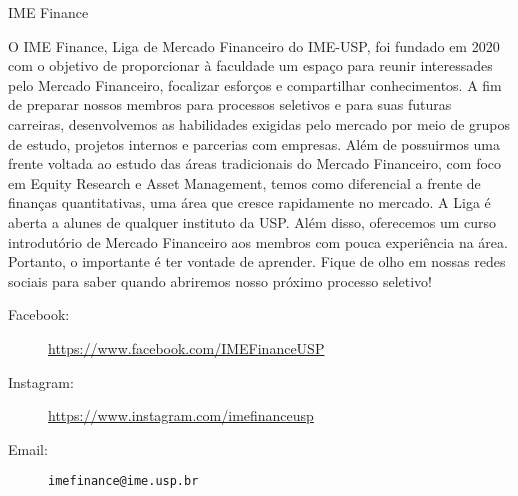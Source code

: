 \begin{subsecao}{IME Finance}

	

O IME Finance, Liga de Mercado Financeiro do IME-USP, foi fundado em 2020 com o 
objetivo de proporcionar à faculdade um espaço para reunir interessades pelo 
Mercado Financeiro, focalizar esforços e compartilhar conhecimentos.
A fim de preparar nossos membros para processos seletivos e para suas futuras 
carreiras, desenvolvemos as habilidades exigidas pelo mercado por meio de grupos de 
estudo, projetos internos e parcerias com empresas. Além de possuirmos uma frente 
voltada ao estudo das áreas tradicionais do Mercado Financeiro, com foco em Equity
Research e Asset Management, temos como diferencial a frente de finanças quantitativas, 
uma área que cresce rapidamente no mercado. A Liga é aberta a alunes de qualquer 
instituto da USP. Além disso, oferecemos um curso introdutório de Mercado Financeiro 
aos membros com pouca experiência na área. Portanto, o importante é ter vontade de 
aprender. Fique de olho em nossas redes sociais para saber quando abriremos nosso 
próximo processo seletivo!

\begin{description}
  \item[Facebook:] \url{https://www.facebook.com/IMEFinanceUSP}
  \item[Instagram:] \url{https://www.instagram.com/imefinanceusp}
  \item[Email:] {\tt imefinance@ime.usp.br}
\end{description}

\end{subsecao}
